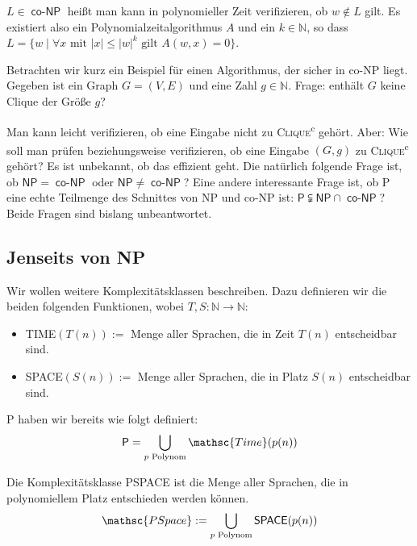 \begin{Bem}
  \hspace{\parindent}$L \in \operatorname{\mathsf{co-NP}}$ heißt man kann in polynomieller Zeit verifizieren, ob $w \notin L$ gilt. Es existiert also ein Polynomialzeitalgorithmus $A$ und ein $k \in \mathbb{N}$, so dass $L=\{ w \mid \forall x \text{ mit } |x| \le |w|^k \text{ gilt } A(w,x)=0 \}$.
\end{Bem}

\begin{Bsp}
  \hspace{\parindent}Betrachten wir kurz ein Beispiel für einen Algorithmus, der sicher in \textsf{co-NP} liegt. Gegeben ist ein Graph $G=(V,E)$ und eine Zahl $g \in \mathbb{N}$. Frage: enthält $G$ keine Clique der Größe $g$?
\end{Bsp}

Man kann leicht verifizieren, ob eine Eingabe nicht zu \textsc{Clique}\textsuperscript{c} gehört. Aber: Wie soll man prüfen beziehungsweise verifizieren, ob eine Eingabe $(G,g)$ zu \textsc{Clique}\textsuperscript{c} gehört? Es ist unbekannt, ob das effizient geht. Die natürlich folgende Frage ist, ob $\mathsf{NP} = \operatorname{\mathsf{co-NP}}$ oder $\mathsf{NP} \neq \operatorname{\mathsf{co-NP}}$? Eine andere interessante Frage ist, ob \textsf{P} eine echte Teilmenge des Schnittes von \textsf{NP} und \textsf{co-NP} ist: $\mathsf{P} \subsetneqq \mathsf{NP} \cap \operatorname{\mathsf{co-NP}}$? Beide Fragen sind bislang unbeantwortet.

\subsection{Jenseits von NP}
Wir wollen weitere Komplexitätsklassen beschreiben. Dazu definieren wir die beiden folgenden Funktionen, wobei $T, S : \mathbb{N} \to \mathbb{N}$:
\begin{itemize}
  \item \textsf{TIME}$(T(n)) :=$ Menge aller Sprachen, die in Zeit $T(n)$ entscheidbar sind.
  \item \textsf{SPACE}$(S(n)) :=$ Menge aller Sprachen, die in Platz $S(n)$ entscheidbar sind.
\end{itemize}


\textsf{P} haben wir bereits wie folgt definiert:
\[ \mathsf{P} = \bigcup_{p \text{ Polynom}} \mathsc{Time}(p(n)) \]

\begin{Def}
  \hspace{\parindent}Die Komplexitätsklasse \textsf{PSPACE} ist die Menge aller Sprachen, die in polynomiellem Platz entschieden werden können.
  \[ \mathsc{PSpace} := \bigcup_{p \text{ Polynom}} \mathsf{SPACE}(p(n)) \]
\end{Def}

